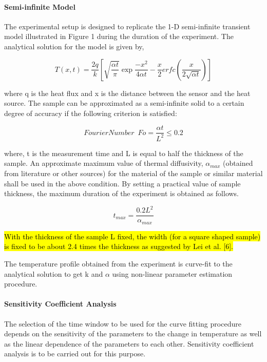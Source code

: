 \documentclass[]{article}
\let\oldparagraph\paragraph
\renewcommand{\paragraph}[1]{\oldparagraph{#1}\mbox{}}
\begin{document}
\hypertarget{header-n10}{%
\paragraph{Semi-infinite Model}\label{header-n10}}

The experimental setup is designed to replicate the 1-D semi-infinite
transient model illustrated in Figure 1 during the duration of the
experiment. The analytical solution for the model is given by,

\[T(x,t) = \frac{2q}{k} \left[ \sqrt{\frac{\alpha t}{\pi}}\exp{\frac{-x^2}{4 \alpha t}} - \frac{x}{2}erfc(\frac{x}{2 \sqrt{\alpha t}})\right]\]

where q is the heat flux and x is the distance between the sensor and
the heat source. The sample can be approximated as a semi-infinite solid
to a certain degree of accuracy if the following criterion is satisfied:

\[Fourier Number  \phantom{1} Fo = \frac{\alpha t }{L^2 } \leq 0.2\]

where, t is the measurement time and L is equal to half the thickness of
the sample. An approximate maximum value of thermal diffusivity,
\(\alpha_{max}\) (obtained from literature or other sources) for the
material of the sample or similar material shall be used in the above
condition. By setting a practical value of sample thickness, the maximum
duration of the experiment is obtained as follows.

\[t_{max} = \frac{0.2L^2}{\alpha_{max}}\]

\hl{With the thickness of the sample L fixed, the width (for a square
shaped sample) is fixed to be about 2.4 times the thickness as suggested
by Lei et al. {[}6{]}.}

The temperature profile obtained from the experiment is curve-fit to the
analytical solution to get k and \(\alpha\) using non-linear parameter
estimation procedure.

\hypertarget{header-n24}{%
\paragraph{Sensitivity Coefficient Analysis}\label{header-n24}}

 The selection of the time window to be used for the curve fitting
procedure depends on the sensitivity of the parameters to the change in
temperature as well as the linear dependence of the parameters to each
other. Sensitivity coefficient analysis is to be carried out for this
purpose.
\end{document}
